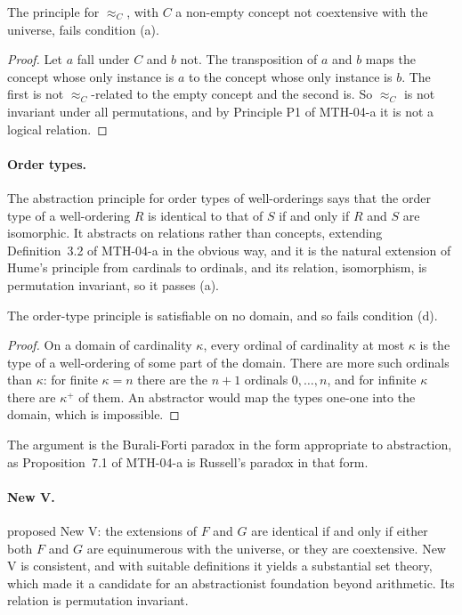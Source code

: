 \documentclass{situationist-preprint}
\begin{document}
\begin{proposition}\label{p:noninv}
The principle for $\approx_C$, with $C$ a non-empty concept not coextensive with the universe, fails condition (a).
\end{proposition}

\begin{proof}
Let $a$ fall under $C$ and $b$ not. The transposition of $a$ and $b$ maps the concept whose only instance is $a$ to the concept whose only instance is $b$. The first is not $\approx_C$-related to the empty concept and the second is. So $\approx_C$ is not invariant under all permutations, and by Principle P1 of MTH-04-a it is not a logical relation.
\end{proof}

\paragraph{Order types.} The abstraction principle for order types of well-orderings says that the order type of a well-ordering $R$ is identical to that of $S$ if and only if $R$ and $S$ are isomorphic. It abstracts on relations rather than concepts, extending Definition~3.2 of MTH-04-a in the obvious way, and it is the natural extension of Hume's principle from cardinals to ordinals, and its relation, isomorphism, is permutation invariant, so it passes (a).

\begin{proposition}\label{p:ord}
The order-type principle is satisfiable on no domain, and so fails condition (d).
\end{proposition}

\begin{proof}
On a domain of cardinality $\kappa$, every ordinal of cardinality at most $\kappa$ is the type of a well-ordering of some part of the domain. There are more such ordinals than $\kappa$: for finite $\kappa = n$ there are the $n + 1$ ordinals $0, \dots, n$, and for infinite $\kappa$ there are $\kappa^+$ of them. An abstractor would map the types one-one into the domain, which is impossible.
\end{proof}

The argument is the Burali-Forti paradox in the form appropriate to abstraction, as Proposition~7.1 of MTH-04-a is Russell's paradox in that form.

\paragraph{New V.} \citet{Boolos1989} proposed New V: the extensions of $F$ and $G$ are identical if and only if either both $F$ and $G$ are equinumerous with the universe, or they are coextensive. New V is consistent, and with suitable definitions it yields a substantial set theory, which made it a candidate for an abstractionist foundation beyond arithmetic. Its relation is permutation invariant.
\end{document}

